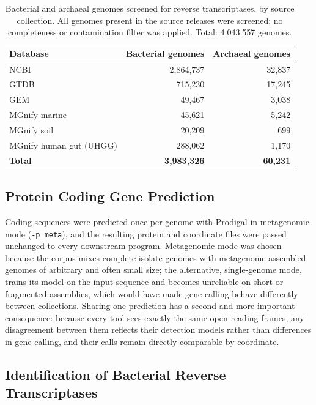 \begin{table}[H]
\centering
\begin{tabular}{@{}lrr@{}}
\toprule
\textbf{Database} & \textbf{Bacterial genomes} & \textbf{Archaeal genomes} \\
\midrule
NCBI                       & 2{,}864{,}737 & 32{,}837 \\
GTDB                       &   715{,}230 & 17{,}245 \\
GEM                        &    49{,}467 &  3{,}038 \\
MGnify marine              &    45{,}621 &  5{,}242 \\
MGnify soil                &    20{,}209 &     699 \\
MGnify human gut (UHGG)    &   288{,}062 &  1{,}170 \\
\midrule
\textbf{Total}             & \textbf{3{,}983{,}326} & \textbf{60{,}231} \\
\bottomrule
\end{tabular}
\caption[Genomes screened for reverse transcriptases]{%
Bacterial and archaeal genomes screened for reverse transcriptases, by source
collection. All genomes present in the source releases were screened; no
completeness or contamination filter was applied. Total: \num{4,043,557} genomes.}
\label{table:genome_comparison}
\end{table}

\subsection{Protein Coding Gene Prediction}

Coding
sequences were predicted once per genome with Prodigal in metagenomic mode
(\texttt{-p meta}), and the resulting protein and coordinate files were passed
unchanged to every downstream program. Metagenomic mode was chosen because the
corpus mixes complete isolate genomes with metagenome-assembled genomes of
arbitrary and often small size; the alternative, single-genome mode, trains its
model on the input sequence and becomes unreliable on short or fragmented
assemblies, which would have made gene calling behave differently between
collections. Sharing one prediction has a second and more important consequence:
because every tool sees exactly the same open reading frames, any disagreement
between them reflects their detection models rather than differences in gene
calling, and their calls remain directly comparable by coordinate.

\subsection{Identification of Bacterial Reverse Transcriptases}

